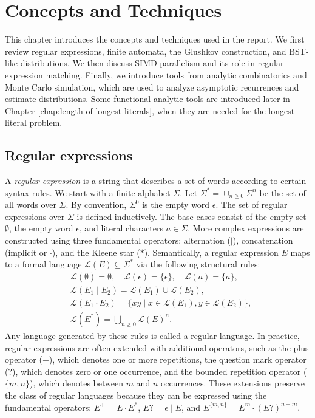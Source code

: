 \chapter{Concepts and Techniques}

This chapter introduces the concepts and techniques used in the report. We first review regular expressions, finite automata, the Glushkov construction, and BST-like distributions. We then discuss SIMD parallelism and its role in regular expression matching. Finally, we introduce tools from analytic combinatorics and Monte Carlo simulation, which are used to analyze asymptotic recurrences and estimate distributions. Some functional-analytic tools are introduced later in Chapter \ref{chap:length-of-longest-literals}, when they are needed for the longest literal problem.

\section{Regular expressions}


A \textit{regular expression} is a string that describes a set of words according to certain syntax rules. We start with a finite alphabet $\Sigma$. Let $\Sigma^*=\cup_{n \ge 0} \Sigma^n$ be the set of all words over $\Sigma$. By convention, $\Sigma^0$ is the empty word $\epsilon$. The set of regular expressions over $\Sigma$ is defined inductively. The base cases consist of the empty set $\emptyset$, the empty word $\epsilon$, and literal characters $a \in \Sigma$. More complex expressions are constructed using three fundamental operators: alternation ($\mid$), concatenation (implicit or $\cdot$), and the Kleene star ($*$). Semantically, a regular expression $E$ maps to a formal language $\mathcal{L}(E) \subseteq \Sigma^*$ via the following structural rules:
\begin{align*}
   & \mathcal{L}(\emptyset)     = \emptyset, \quad \mathcal{L}(\epsilon) = \{\epsilon\}, \quad \mathcal{L}(a) = \{a\}, \\
   & \mathcal{L}(E_1 \mid E_2)     = \mathcal{L}(E_1) \cup \mathcal{L}(E_2),                                           \\
   & \mathcal{L}(E_1 \cdot E_2) = \{ xy \mid x \in \mathcal{L}(E_1), y \in \mathcal{L}(E_2) \},                        \\
   & \mathcal{L}(E^*)            = \bigcup_{n \ge 0} \mathcal{L}(E)^n.
\end{align*}
Any language generated by these rules is called a regular language. In practice, regular expressions are often extended with additional operators, such as the plus operator ($+$), which denotes one or more repetitions, the question mark operator ($?$), which denotes zero or one occurrence, and the bounded repetition operator ($\{m,n\}$), which denotes between $m$ and $n$ occurrences. These extensions preserve the class of regular languages because they can be expressed using the fundamental operators: $E^+ = E \cdot E^*$, $E? = \epsilon \mid E$, and $E^{\{m,n\}} = E^m \cdot (E?)^{n-m}$.

